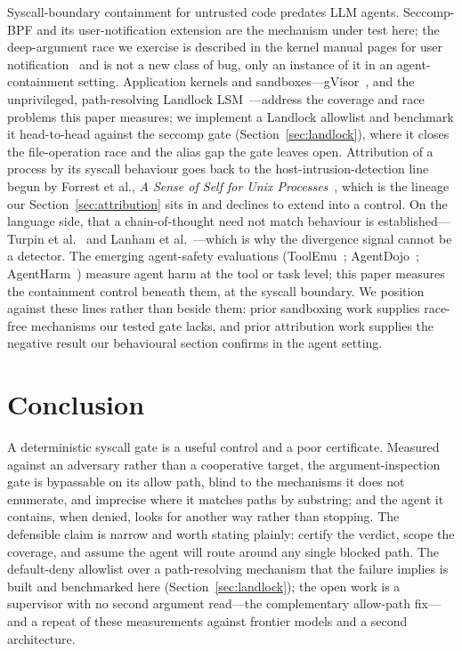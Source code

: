 \documentclass[11pt]{article}
\begin{document}
Syscall-boundary containment for untrusted code predates LLM agents. Seccomp-BPF and its user-notification
extension are the mechanism under test here; the deep-argument race we exercise is described in the kernel
manual pages for user notification~\cite{seccompunotify} and is not a new class of bug, only an instance of
it in an agent-containment setting. Application kernels and sandboxes---gVisor~\cite{gvisor}, and the
unprivileged, path-resolving Landlock LSM~\cite{landlock}---address the coverage and race problems this
paper measures; we implement a Landlock allowlist and benchmark it head-to-head against the seccomp gate
(Section~\ref{sec:landlock}), where it closes the file-operation race and the alias gap the gate leaves
open. Attribution of a process by its syscall behaviour goes back to the
host-intrusion-detection line begun by Forrest et al., \emph{A Sense of Self for Unix Processes}~\cite{forrest96},
which is the lineage our Section~\ref{sec:attribution} sits in and declines to extend into a control. On the
language side, that a chain-of-thought need not match behaviour is established---Turpin et
al.~\cite{turpin23} and Lanham et al.~\cite{lanham23}---which is why the divergence signal cannot be a
detector. The emerging agent-safety evaluations (ToolEmu~\cite{toolemu}; AgentDojo~\cite{agentdojo};
AgentHarm~\cite{agentharm}) measure agent harm at the tool or task level; this paper measures the
containment control beneath them, at the syscall boundary. We position against these lines rather than
beside them: prior sandboxing work supplies race-free mechanisms our tested gate lacks, and prior
attribution work supplies the negative result our behavioural section confirms in the agent setting.

\section{Conclusion}\label{sec:conclusion}

A deterministic syscall gate is a useful control and a poor certificate. Measured against an adversary
rather than a cooperative target, the argument-inspection gate is bypassable on its allow path, blind to
the mechanisms it does not enumerate, and imprecise where it matches paths by substring; and the agent it
contains, when denied, looks for another way rather than stopping. The defensible claim is narrow and worth
stating plainly: certify the verdict, scope the coverage, and assume the agent will route around any single
blocked path. The default-deny allowlist over a path-resolving mechanism that the failure implies is built
and benchmarked here (Section~\ref{sec:landlock}); the open work is a supervisor with no second argument
read---the complementary allow-path fix---and a repeat of these measurements against frontier models and a
second architecture.
\end{document}
